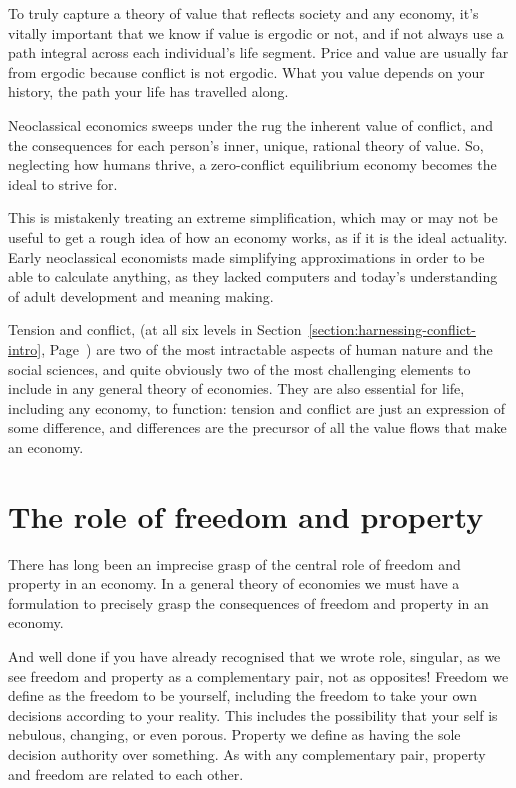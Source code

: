 To truly capture a theory of value that reflects society and any economy, it's vitally important that we know if value is ergodic or not, and if not always use a path integral across each individual's life segment. Price and value are usually far from ergodic because conflict is not ergodic.  What you value depends on your history, the path your life has travelled along.


Neoclassical economics  sweeps under the rug\cite{dowd-capitalism} the inherent value of conflict,  and the consequences for each person’s inner, unique, rational theory of value. So, neglecting how humans thrive, a zero-conflict equilibrium economy becomes the ideal to strive for.


This is mistakenly treating an extreme simplification, which may or may not be useful to get a rough idea of how an economy works, as if it is the ideal actuality\cite{thurow-dangerous}. Early neoclassical economists made simplifying approximations in order to be able to calculate anything, as they lacked computers and today’s understanding of adult development and meaning making. 


Tension and conflict,  (at all six levels in Section~\ref{section:harnessing-conflict-intro}, Page~\pageref{section:harnessing-conflict-intro}) are two of the most intractable aspects of human nature and the social sciences, and quite obviously two of the most challenging elements to include in any general theory of economies. They are also essential for life, including any economy, to function: tension and conflict are just an expression of some difference, and differences are the precursor of all the value flows that make an economy. 




\section{The role of freedom and property}
There has long been an imprecise grasp of the central role of freedom  and property in an economy.  In a general theory of economies  we must have a formulation to precisely grasp the consequences of freedom and property in an economy.


And well done if you have already recognised that we wrote role, singular, as we see freedom and property as a complementary pair,   not as opposites! Freedom  we define as the freedom to be yourself, including the freedom to take your own decisions according to your reality. This includes the possibility that your self is nebulous, changing, or even porous. Property  we define as having the sole decision authority over something. As with any complementary pair, property and freedom are related to each other.


